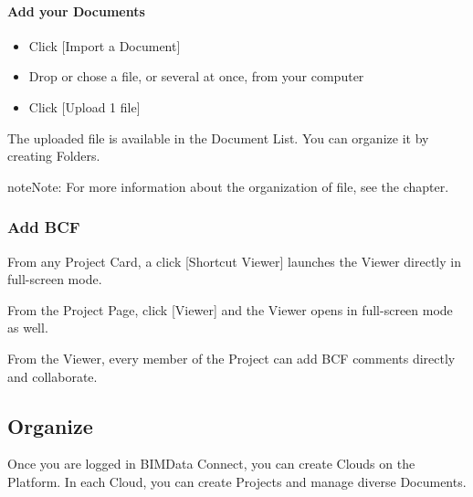 \documentclass[a4paper,12pt,english]{sphinxmanual}
\begin{document}
\paragraph{Add your Documents}
\label{\detokenize{platform/add_content:add-your-documents}}\begin{itemize}
\item {} 
Click {[}Import a Document{]}

\item {} 
Drop or chose a file, or several at once, from your computer

\end{itemize}
\begin{itemize}
\item {} 
 Click {[}Upload 1 file{]}

\end{itemize}


The uploaded file is available in the Document List. You can organize it by creating Folders.

\begin{sphinxadmonition}{note}{Note:}
For more information about the organization of file, see the  chapter.
\end{sphinxadmonition}


\subsubsection{Add BCF}
\label{\detokenize{platform/add_content:add-bcf}}
From any Project Card, a click {[}Shortcut Viewer{]} launches the Viewer directly in full-screen mode. 

From the Project Page, click {[}Viewer{]} and the Viewer opens in full-screen mode as well.

From the Viewer, every member of the Project can add BCF comments directly and collaborate.


\subsection{Organize}
\label{\detokenize{platform/organize:organize}}\label{\detokenize{platform/organize::doc}}
Once you are logged in BIMData Connect, you can create Clouds on the Platform.
In each Cloud, you can create Projects and manage diverse Documents.
\end{document}
